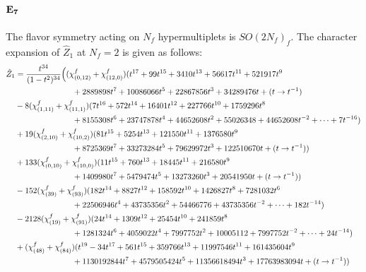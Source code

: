 \documentclass[letterpaper, 11pt]{article}
\newcommand{\nn}{\nonumber}
\begin{document}
{\paragraph{$\bf E_7$} The flavor symmetry acting on $N_f$ hypermultiplets is $SO(2N_f)_f$. The character expansion of $\hat{Z}_1$ at $N_f=2$ is given as follows:
  \begin{align}
    \label{eq:E7F2}
    \hat{Z}_1&=\frac{t^{34}}{(1-t^2)^{34}}\Big((\chi^f_{(0,12)}+\chi^f_{(12,0)})(t^{17}+99 t^{15}+3410 t^{13}+56617 t^{11}+521917 t^9\\
    &\hspace{2.5cm}+2889898 t^7+10086066 t^5+22867856t^3+34289476t+(t\rightarrow t^{-1})\nn\\
    &-8(\chi^f_{(1,11)}+\chi^f_{(11,1)})(7 t^{16}+572 t^{14}+16401 t^{12}+227766 t^{10}+1759296 t^8\nn\\
    &\hspace{2.5cm}+8155308 t^6+23747878 t^4+44652608t^2+55026348+44652608t^{-2}+\cdots+7t^{-16})\nn\\
    &+19(\chi^f_{(2,10)}+\chi^f_{(10,2)})(81 t^{15}+5254 t^{13}+121550 t^{11}+1376580 t^9\nn\\
    &\hspace{2.5cm}+8725369 t^7+33273284 t^5+79629972t^3+122510670t+(t\rightarrow t^{-1}))\nn\\
    &+133(\chi^f_{(0,10)}+\chi^f_{(10,0)})(11 t^{15}+760 t^{13}+18445 t^{11}+216580 t^9\nn\\
    &\hspace{2.5cm}+1409980 t^7+5479474 t^5+13273260t^3+20541950t+(t\rightarrow t^{-1}))\nn\\
    &-152(\chi^f_{(39)}+\chi^f_{(93)})(182 t^{14}+8827 t^{12}+158592 t^{10}+1426827 t^8+7281032 t^6\nn\\
    &\hspace{2.5cm}+22506946 t^4+43735356t^2+54466776+43735356t^{-2}+\cdots+182t^{-14})\nn\\
    &-2128(\chi^f_{(19)}+\chi^f_{(91)})(24 t^{14}+1309 t^{12}+25454 t^{10}+241859 t^8\nn\\
    &\hspace{2.5cm}+1281324 t^6+4059022 t^4+7997752t^2+10005112+7997752t^{-2}+\cdots+24t^{-14})\nn\\
    &+(\chi^f_{(48)}+\chi^f_{(84)})(t^{19}-34 t^{17}+561 t^{15}+359766 t^{13}+11997546 t^{11}+161435604 t^9\nn\\
    &\hspace{2.5cm}+1130192844t^7+4579505424 t^5+11356618494t^3+17763983094t+(t\rightarrow t^{-1}))\nn\\

\end{align}}
\end{document}
